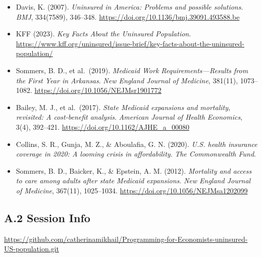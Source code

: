 \documentclass[
]{article}
\providecommand{\tightlist}{%
  \setlength{\itemsep}{0pt}\setlength{\parskip}{0pt}}
\begin{document}
\begin{itemize}
\tightlist
\item
  Davis, K. (2007). \emph{Uninsured in America: Problems and possible
  solutions}. \emph{BMJ}, 334(7589), 346--348.
  \url{https://doi.org/10.1136/bmj.39091.493588.be}
\item
  KFF (2023). \emph{Key Facts About the Uninsured Population}.
  \url{https://www.kff.org/uninsured/issue-brief/key-facts-about-the-uninsured-population/}
\item
  Sommers, B. D., et al.~(2019). \emph{Medicaid Work
  Requirements---Results from the First Year in Arkansas}. \emph{New
  England Journal of Medicine}, 381(11), 1073--1082.
  \url{https://doi.org/10.1056/NEJMsr1901772}
\item
  Bailey, M. J., et al.~(2017). \emph{State Medicaid expansions and
  mortality, revisited: A cost-benefit analysis}. \emph{American Journal
  of Health Economics}, 3(4), 392--421.
  \url{https://doi.org/10.1162/AJHE_a_00080}
\item
  Collins, S. R., Gunja, M. Z., \& Aboulafia, G. N. (2020). \emph{U.S.
  health insurance coverage in 2020: A looming crisis in affordability}.
  \emph{The Commonwealth Fund}.
\item
  Sommers, B. D., Baicker, K., \& Epstein, A. M. (2012). \emph{Mortality
  and access to care among adults after state Medicaid expansions}.
  \emph{New England Journal of Medicine}, 367(11), 1025--1034.
  \url{https://doi.org/10.1056/NEJMsa1202099}
\end{itemize}

\subsection{A.2 Session Info}\label{a.2-session-info}

\url{https://github.com/catherinamikhail/Programming-for-Economists-uninsured-US-population.git}
\end{document}
